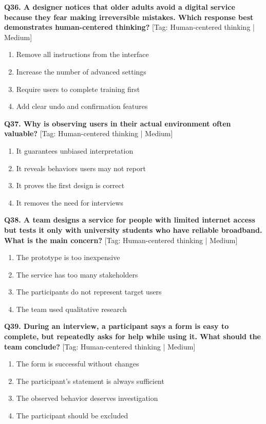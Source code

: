 \noindent\textbf{Q36. A designer notices that older adults avoid a digital service because they fear making irreversible mistakes. Which response best demonstrates human-centered thinking?} \hfill [Tag: Human-centered thinking | Medium]
\begin{enumerate}[label=(\alph*),topsep=2pt,itemsep=1pt,partopsep=0pt,parsep=0pt]
    \item {Remove all instructions from the interface}
    \item {Increase the number of advanced settings}
    \item {Require users to complete training first}
    \item {Add clear undo and confirmation features}
\end{enumerate}
\vspace{2mm}

\noindent\textbf{Q37. Why is observing users in their actual environment often valuable?} \hfill [Tag: Human-centered thinking | Medium]
\begin{enumerate}[label=(\alph*),topsep=2pt,itemsep=1pt,partopsep=0pt,parsep=0pt]
    \item {It guarantees unbiased interpretation}
    \item {It reveals behaviors users may not report}
    \item {It proves the first design is correct}
    \item {It removes the need for interviews}
\end{enumerate}
\vspace{2mm}

\noindent\textbf{Q38. A team designs a service for people with limited internet access but tests it only with university students who have reliable broadband. What is the main concern?} \hfill [Tag: Human-centered thinking | Medium]
\begin{enumerate}[label=(\alph*),topsep=2pt,itemsep=1pt,partopsep=0pt,parsep=0pt]
    \item {The prototype is too inexpensive}
    \item {The service has too many stakeholders}
    \item {The participants do not represent target users}
    \item {The team used qualitative research}
\end{enumerate}
\vspace{2mm}

\noindent\textbf{Q39. During an interview, a participant says a form is easy to complete, but repeatedly asks for help while using it. What should the team conclude?} \hfill [Tag: Human-centered thinking | Medium]
\begin{enumerate}[label=(\alph*),topsep=2pt,itemsep=1pt,partopsep=0pt,parsep=0pt]
    \item {The form is successful without changes}
    \item {The participant's statement is always sufficient}
    \item {The observed behavior deserves investigation}
    \item {The participant should be excluded}
\end{enumerate}
\vspace{2mm}

